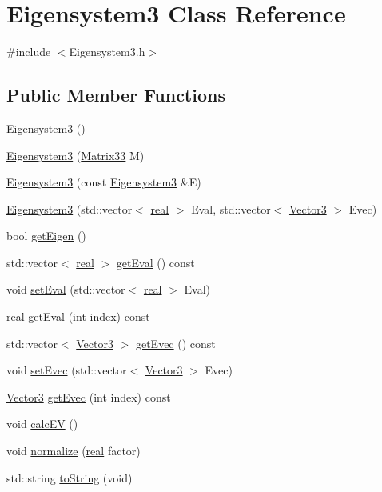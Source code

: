 \section{Eigensystem3 Class Reference}
\label{classEigensystem3}


{\ttfamily \#include $<$Eigensystem3.h$>$}

\subsection*{Public Member Functions}
\begin{DoxyCompactItemize}
\item 
\hyperlink{classEigensystem3_a31ab53ba1ff2c9d3e03d14775954b770}{Eigensystem3} ()
\item 
\hyperlink{classEigensystem3_a94eb6dfdeee381ed3992e5dbb21320d3}{Eigensystem3} (\hyperlink{classMatrix33}{Matrix33} M)
\item 
\hyperlink{classEigensystem3_ae70fe46879986f1116a9388c44195d8c}{Eigensystem3} (const \hyperlink{classEigensystem3}{Eigensystem3} \&E)
\item 
\hyperlink{classEigensystem3_ac8b891bd1c9a91f970fbec6ee984f26a}{Eigensystem3} (std::vector$<$ \hyperlink{Global_8h_a031f8951175b43076c2084a6c2173410}{real} $>$ Eval, std::vector$<$ \hyperlink{classVector3}{Vector3} $>$ Evec)
\item 
bool \hyperlink{classEigensystem3_af65d8d9d661b4ba74f2553227bfc16fb}{getEigen} ()
\item 
std::vector$<$ \hyperlink{Global_8h_a031f8951175b43076c2084a6c2173410}{real} $>$ \hyperlink{classEigensystem3_a5f76eedf7a13ebb22f59104fe31f808c}{getEval} () const 
\item 
void \hyperlink{classEigensystem3_a059896de8f00f94f929019a87253ef28}{setEval} (std::vector$<$ \hyperlink{Global_8h_a031f8951175b43076c2084a6c2173410}{real} $>$ Eval)
\item 
\hyperlink{Global_8h_a031f8951175b43076c2084a6c2173410}{real} \hyperlink{classEigensystem3_a81e7fd6be94263e763437c9be028c660}{getEval} (int index) const 
\item 
std::vector$<$ \hyperlink{classVector3}{Vector3} $>$ \hyperlink{classEigensystem3_a66bba9e069680e1fd2bbe66220fc13c8}{getEvec} () const 
\item 
void \hyperlink{classEigensystem3_ad15598642fbd83f34cad73a301b43b89}{setEvec} (std::vector$<$ \hyperlink{classVector3}{Vector3} $>$ Evec)
\item 
\hyperlink{classVector3}{Vector3} \hyperlink{classEigensystem3_ad3be2903d6b0f1c3513d2e920f08faae}{getEvec} (int index) const 
\item 
void \hyperlink{classEigensystem3_adc1e3e6fdbe879e34fa403468eb0800f}{calcEV} ()
\item 
void \hyperlink{classEigensystem3_abae2814e44087582c68ea7511f5fd07d}{normalize} (\hyperlink{Global_8h_a031f8951175b43076c2084a6c2173410}{real} factor)
\item 
std::string \hyperlink{classEigensystem3_a1e3d57b18699eacbf3de9e07fdfacd1f}{toString} (void)
\end{DoxyCompactItemize}


